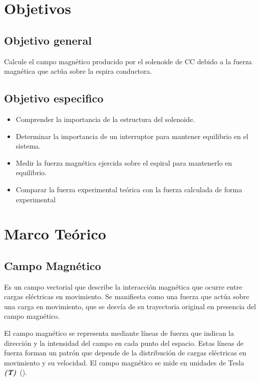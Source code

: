 \documentclass[twocolumn, 12pt]{article}
\begin{document}

\section{Objetivos}

\subsection{Objetivo general}

Calcule el campo magnético producido por el solenoide de CC
debido a la fuerza magnética que actúa sobre la espira
conductora.

\subsection{Objetivo especifico}

\begin{itemize}[label=$\triangleright$]
	\item Comprender la importancia de la estructura del solenoide.
	\item Determinar la importancia de un interruptor para mantener
	      equilibrio en el sistema.
	\item Medir la fuerza magnética ejercida sobre el espiral para
	      mantenerlo en equilibrio.
	\item Comparar la fuerza experimental teórica con la fuerza
	      calculada de forma experimental
\end{itemize}

\section{Marco Teórico}

\subsection*{Campo Magnético}

Es un campo vectorial que describe la interacción magnética
que ocurre entre cargas eléctricas en movimiento. Se
manifiesta como una fuerza que actúa sobre una carga en
movimiento, que se desvía de su trayectoria original en
presencia del campo magnético.

El campo magnético se representa mediante líneas de fuerza
que indican la dirección y la intensidad del campo en cada
punto del espacio. Estas líneas de fuerza forman un patrón
que depende de la distribución de cargas eléctricas en
movimiento y su velocidad. El campo magnético se mide en
unidades de Tesla
\textit{\textbf{(T)}}~(\cite{magnetic-fields-khanacademy}).
\end{document}
